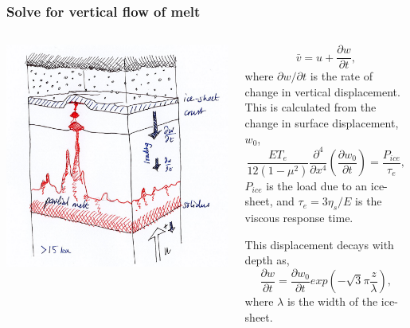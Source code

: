 \documentclass[aspectratio=169]{beamer}
\begin{document}
\begin{frame}
    \frametitle{Solve for vertical flow of melt}
    \begin{columns}
        \begin{column}{0.5\textwidth}
            \includegraphics[width=.45\paperwidth]{./figures/sketch1a.png}
        \end{column}
        \begin{column}{0.5\textwidth}
            \[
            \bar{v} = u + \frac{\partial w}{\partial t},
            \]
            where $\partial w/ \partial t$ is the rate of change in vertical displacement. This is calculated from the change in surface displacement, $w_{0}$,
            \[
            \frac{ET_{e}}{12\left(1-\mu^{2}\right)} \frac{\partial^{4}}{\partial x^{4}}\left(\frac{\partial w_{0}}{\partial t}\right) = \frac{P_{ice}}{\tau_{e}},
            \]
            $P_{ice}$ is the load due to an ice-sheet, and $\tau_{e} = 3\eta_{s}/E$ is the viscous response time.

            This displacement decays with depth as,
            \[
            \frac{\partial w}{\partial t} = \frac{\partial w_{0}}{\partial t}exp\left(-\sqrt{3}\pi\frac{z}{\lambda}\right),
            \]
            where $\lambda$ is the width of the ice-sheet.
        \end{column}
    \end{columns}
\end{frame}
\end{document}
